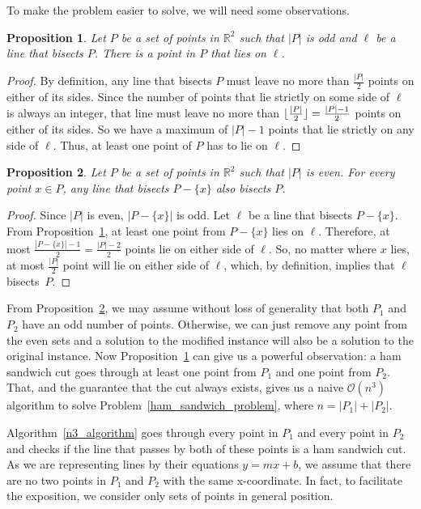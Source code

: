 \documentclass{article}
\DeclarePairedDelimiter\floor{\lfloor}{\rfloor}
\def\realnumbers{\mathbb{R}}
\def\bigo{\mathcal{O}}
\newtheorem{proposition}{Proposition}
\begin{document}
To make the problem easier to solve, we will need some observations.

\begin{proposition}
\label{lies_on_odd_proposition}
Let $P$ be a set of points in $\realnumbers^2$ such that $|P|$ is odd and $\ell$ be a line that bisects $P$. There is a point in $P$ that lies on $\ell$.
\end{proposition}
\begin{proof}
By definition, any line that bisects $P$ must leave no more than $\frac{|P|}{2}$ points on either of its sides. Since the number of points that lie strictly on some side of $\ell$ is always an integer, that line must leave no more than $\floor{\frac{|P|}{2}} = \frac{|P|-1}{2}$ points on either of its sides. So we have a maximum of $|P|-1$ points that lie strictly on any side of $\ell$. Thus, at least one point of $P$ has to lie on $\ell$.
\end{proof}

\begin{proposition}
\label{can_solve_odd_proposition}
Let $P$ be a set of points in $\realnumbers^2$ such that $|P|$ is even. For every point $x\in P$, any line that bisects $P-\{x\}$ also bisects $P$.
\end{proposition}
\begin{proof}
Since $|P|$ is even, $|P-\{x\}|$ is odd. Let $\ell$ be a line that bisects $P-\{x\}$. From Proposition~\ref{lies_on_odd_proposition}, at least one point from $P-\{x\}$ lies on $\ell$.  Therefore, at most $\frac{|P-\{x\}|-1}{2}=\frac{|P|-2}{2}$ points lie on either side of $\ell$. So, no matter where $x$ lies, at most $\frac{|P|}{2}$ point will lie on either side of $\ell$, which, by definition, implies that $\ell$ bisects~$P$.
\end{proof}

From Proposition~\ref{can_solve_odd_proposition}, we may assume without loss of generality that both $P_1$ and~$P_2$ have an odd number of points. Otherwise, we can just remove any point from the even sets and a solution to the modified instance will also be a solution to the original instance.
Now Proposition~\ref{lies_on_odd_proposition} can give us a powerful observation: a ham sandwich cut goes through at least one point from $P_1$ and one point from $P_2$. That, and the guarantee that the cut always exists, gives us a naive $\bigo(n^3)$ algorithm to solve Problem~\ref{ham_sandwich_problem}, where $n = |P_1|+|P_2|$.

Algorithm~\ref{n3_algorithm} goes through every point in $P_1$ and every point in $P_2$ and checks if the line that passes by both of these points is a ham sandwich cut. As we are representing lines by their equations $y=mx+b$, we assume that there are no two points in $P_1$ and $P_2$ with the same x-coordinate.  In fact, to facilitate the exposition, we consider only sets of points in general position.
\end{document}
